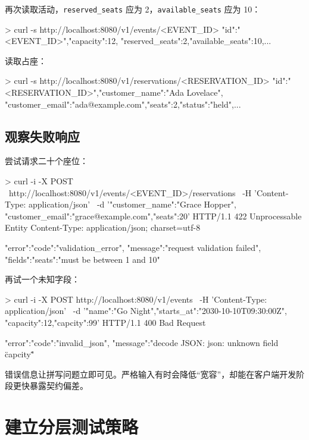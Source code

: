 再次读取活动，\texttt{reserved\_seats} 应为 2，\texttt{available\_seats} 应为 10：

\begin{shellcode}[]
> curl -s http://localhost:8080/v1/events/<EVENT_ID>
{"id":"<EVENT_ID>","capacity":12,
"reserved_seats":2,"available_seats":10,...}
\end{shellcode}
\color{PocketInk}

读取占座：

\begin{shellcode}[]
> curl -s http://localhost:8080/v1/reservations/<RESERVATION_ID>
{"id":"<RESERVATION_ID>","customer_name":"Ada Lovelace",
"customer_email":"ada@example.com","seats":2,"status":"held",...}
\end{shellcode}
\color{PocketInk}

\subsection{观察失败响应}

尝试请求二十个座位：

\begin{shellcode}[]
> curl -i -X POST \
    http://localhost:8080/v1/events/<EVENT_ID>/reservations \
    -H 'Content-Type: application/json' \
    -d '{"customer_name":"Grace Hopper",
         "customer_email":"grace@example.com","seats":20}'
HTTP/1.1 422 Unprocessable Entity
Content-Type: application/json; charset=utf-8

{"error":{"code":"validation_error",
"message":"request validation failed",
"fields":{"seats":"must be between 1 and 10"}}}
\end{shellcode}
\color{PocketInk}

再试一个未知字段：

\begin{shellcode}[]
> curl -i -X POST http://localhost:8080/v1/events \
    -H 'Content-Type: application/json' \
    -d '{"name":"Go Night","starts_at":"2030-10-10T09:30:00Z",
         "capacity":12,"capcity":99}'
HTTP/1.1 400 Bad Request

{"error":{"code":"invalid_json",
"message":"decode JSON: json: unknown field \"capcity\""}}
\end{shellcode}
\color{PocketInk}

错误信息让拼写问题立即可见。严格输入有时会降低“宽容”，却能在客户端开发阶段更快暴露契约偏差。

\section{建立分层测试策略}

